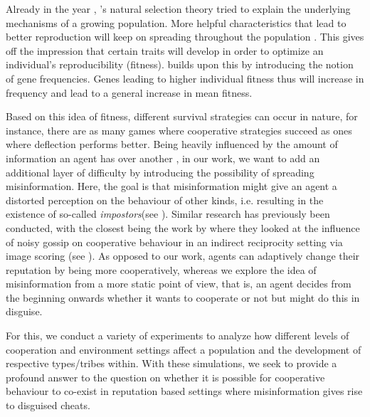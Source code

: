 \documentclass[sigconf]{acmart}
\newcommand{\impostors}{\textit{impostors}\xspace}
\begin{document}
    Already in the year \citeyear{darwin_origin_1859}, \citeauthor{darwin_origin_1859}'s natural selection theory tried to explain the underlying mechanisms of a growing population.
    More helpful characteristics that lead to better reproduction will keep on spreading throughout the population \cite{darwin_origin_1859}.
    This gives off the impression that certain traits will develop in order to optimize an individual's reproducibility (fitness). \citeauthor{fisherGeneticalTheoryNatural1930} \cite{fisherGeneticalTheoryNatural1930} builds upon this by introducing the notion of gene frequencies.
    Genes leading to higher individual fitness thus will increase in frequency and lead to a general increase in mean fitness.



    Based on this idea of fitness, different survival strategies can occur in nature, for instance, there are as many games where cooperative strategies succeed as ones where deflection performs better.
    Being heavily influenced by the amount of information an agent has over another \cite{wallace_misinformation_1973}, in our work, we want to add an additional layer of difficulty by introducing the possibility of spreading misinformation.
    Here, the goal is that misinformation might give an agent a distorted perception on the behaviour of other kinds, i.e. resulting in the existence of so-called \impostors (see ).
    Similar research has previously been conducted, with the closest being the work by \citeauthor{szamado_deception_2016} \cite{szamado_deception_2016} where they looked at the influence of noisy gossip on cooperative behaviour in an indirect reciprocity setting via image scoring (see ).
    As opposed to our work, agents can adaptively change their reputation by being more cooperatively, whereas we explore the idea of misinformation from a more static point of view, that is, an agent decides from the beginning onwards whether it wants to cooperate or not but might do this in disguise.

    For this, we conduct a variety of experiments to analyze how different levels of cooperation and environment settings affect a population and the development of respective types/tribes within.
    With these simulations, we seek to provide a profound answer to the question on whether it is possible for cooperative behaviour to co-exist in reputation based settings where misinformation gives rise to disguised cheats.
\end{document}
